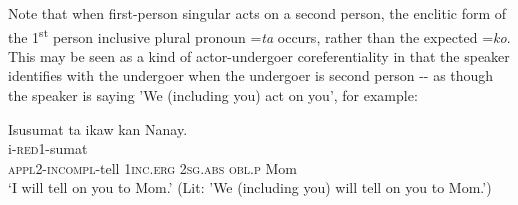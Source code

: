 \documentclass[output=paper]{langscibook}
\begin{document}
\begin{table}
    \caption{Personal pronouns of Waray}
    \label{tab:Payne:1}
\end{table}




Note that when first-person singular acts on a second person, the enclitic form of the 1\textsuperscript{st} person inclusive plural pronoun =\textit{ta} occurs, rather than the expected =\textit{ko}. This may be seen as a kind of actor-undergoer coreferentiality in that the speaker identifies with the undergoer when the undergoer is second person -{}- as though the speaker is saying 'We (including you) act on you', for example:

\ea\label{ex:Payne:3}
\glll Isusumat ta ikaw kan Nanay.\\
i-\textsc{red}1-sumat\\
\textsc{appl}2-\textsc{incompl}-tell 1\textsc{inc.erg} 2\textsc{sg.abs} \textsc{obl.p} Mom\\
\glt ‘I will tell on you to Mom.' (Lit:  'We (including you) will tell on you to Mom.')
\z
\end{document}
